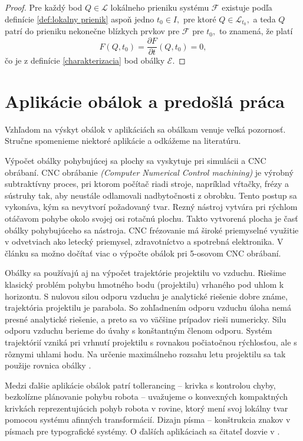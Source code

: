 \begin{proof}
Pre každý bod $Q \in \mathcal{L}$ lokálneho prieniku systému $\mathcal{F}$ existuje podľa definície \ref{def:lokalny prienik} aspoň jedno $t_0 \in I,$ pre ktoré $Q \in \mathcal{L}_{t_0}, $ a teda $Q$ patrí do prieniku nekonečne blízkych prvkov pre $\mathcal{F}$ pre $t_0,$ to znamená, že platí
$$ F(Q, t_0) = \dfrac{\partial F}{\partial t} (Q, t_0) = 0,
$$  
čo je z definície \ref{charakterizacia} bod obálky $\mathcal{E}.$
\end{proof}

\section{Aplikácie obálok a predošlá práca}
Vzhľadom na výskyt obálok v aplikáciách sa obálkam venuje veľká pozornosť. Stručne spomenieme niektoré aplikácie a odkážeme na literatúru. 

Výpočet obálky pohybujúcej sa plochy sa vyskytuje pri simulácii a CNC obrábaní. CNC obrábanie \textit{(Computer Numerical Control machining)}  je výrobný subtraktívny proces, pri ktorom počítač riadi stroje, napríklad vŕtačky, frézy a sústruhy tak, aby neustále odlamovali nadbytočnosti z obrobku. Tento postup sa vykonáva, kým sa nevytvorí požadovaný tvar. Rezný nástroj vytvára pri rýchlom otáčavom pohybe okolo svojej osi rotačnú plochu. Takto vytvorená plocha je časť obálky pohybujúceho sa nástroja. CNC frézovanie má široké priemyselné využitie v odvetviach ako letecký priemysel, zdravotníctvo a spotrebná elektronika. V článku \cite{Skop20} sa možno dočítať viac o výpočte obálok pri 5-osovom CNC obrábaní.  

Obálky sa používajú aj na výpočet trajektórie projektilu vo vzduchu. Riešime klasický problém pohybu hmotného bodu (projektilu) vrhaného pod uhlom k horizontu. S nulovou silou odporu vzduchu je analytické riešenie dobre známe, trajektória projektilu je parabola. So zohľadnením odporu vzduchu úloha nemá presné analytické riešenie, a preto sa vo väčšine prípadov rieši numericky. Silu odporu vzduchu berieme do úvahy s konštantným členom odporu. Systém trajektórií vzniká pri vrhnutí projektilu s rovnakou počiatočnou rýchlosťou, ale s rôznymi uhlami hodu. Na určenie maximálneho rozsahu letu projektilu sa tak použije rovnica obálky \cite{Chud09}.

Medzi ďalšie aplikácie obálok patrí tollerancing – krivka s kontrolou chyby, bezkolízne plánovanie pohybu robota – uvažujeme o konvexných kompaktných krivkách reprezentujúcich pohyb robota v rovine, ktorý mení svoj lokálny tvar pomocou systému afinných transformácií. Dizajn písma – konštrukcia znakov v písmach pre typografické systémy. O ďalších aplikáciach sa čitateľ dozvie v \cite{Pott09}.

